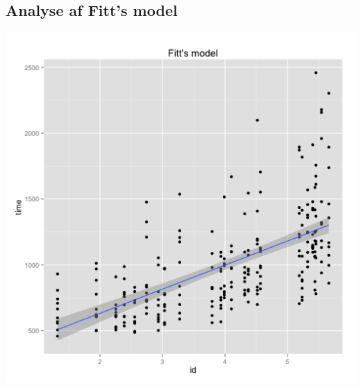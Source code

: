 


\subsection*{Analyse af Fitt's model}
\begin{minipage}{.5\textwidth}
	\centering
	\includegraphics[width=\textwidth]{images/plots/plot_model_fitt}
	\label{fig:plot_model_fitt}
\end{minipage}

